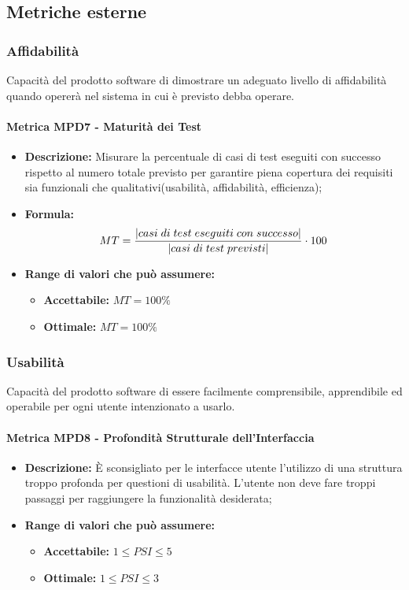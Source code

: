        
\subsection{Metriche esterne}

\subsubsection{Affidabilità}
Capacità del prodotto software di dimostrare un adeguato livello di affidabilità quando opererà nel sistema in cui è previsto debba operare.
    
\paragraph{Metrica MPD7 - Maturità dei Test} 
\begin{itemize}
    \item \textbf{Descrizione:} Misurare la percentuale di casi di test eseguiti con successo rispetto al numero totale previsto per garantire piena copertura dei requisiti sia funzionali che qualitativi(usabilità, affidabilità, efficienza);
    \item \textbf{Formula:} $$MT = {|casi \; di \; test \; eseguiti \; con \; successo| \over |casi \; di \; test \; previsti|} \cdot 100$$
	\item \textbf{Range di valori che può assumere:}
    \begin{itemize}
        \item \textbf{Accettabile:} $MT = 100\% $
        \item \textbf{Ottimale:} $MT = 100\% $
    \end{itemize}
\end{itemize}
       
\subsubsection{Usabilità}
Capacità del prodotto software di essere facilmente comprensibile, apprendibile ed operabile per ogni utente intenzionato a usarlo.

\paragraph{Metrica MPD8 - Profondità Strutturale dell'Interfaccia}
\begin{itemize}
    \item \textbf{Descrizione:} È sconsigliato per le interfacce utente l'utilizzo di una struttura troppo profonda per questioni di usabilità. L'utente non deve fare troppi passaggi per raggiungere la funzionalità desiderata;
    \item \textbf{Range di valori che può assumere:}
    \begin{itemize}
        \item \textbf{Accettabile:} $1 \leq PSI \leq 5$
        \item \textbf{Ottimale:} $1 \leq PSI \leq 3$
    \end{itemize}
\end{itemize}

